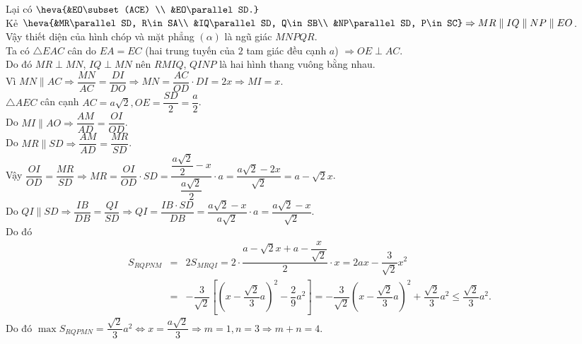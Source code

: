 \begin{ex}
{\begin{enumerate}
Lại có $\heva{&EO\subset(ACE) \\
&EO\parallel SD.}$\\
Kẻ $\heva{&MR\parallel SD, R\in SA\\
&IQ\parallel SD, Q\in SB\\
&NP\parallel SD, P\in SC} \Rightarrow MR\parallel IQ\parallel NP\parallel EO$.\\
Vậy thiết diện của hình chóp và mặt phẳng $(\alpha)$ là ngũ giác $MNPQR$.\\
Ta có $\triangle EAC$ cân do $EA=EC$ (hai trung tuyến của $2$ tam giác đều cạnh $a$) $\Rightarrow OE\perp AC$.\\
Do đó $MR\perp MN$, $IQ\perp MN$ nên $RMIQ$, $QINP$ là hai hình thang vuông bằng nhau.\\
Vì $MN\parallel AC\Rightarrow \dfrac{MN}{AC}=\dfrac{DI}{DO} \Rightarrow MN=\dfrac{AC}{OD} \cdot DI=2x \Rightarrow MI=x$.\\
$\triangle AEC$ cân cạnh $AC=a \sqrt{2}, OE=\dfrac{SD}{2}=\dfrac{a}{2}$.\\
Do $MI\parallel AO\Rightarrow \dfrac{AM}{AD}=\dfrac{OI}{OD}$.\\
Do $MR\parallel SD\Rightarrow \dfrac{AM}{AD}=\dfrac{MR}{SD}$.\\
Vậy $\dfrac{OI}{OD}=\dfrac{MR}{SD} \Rightarrow MR=\dfrac{OI}{OD} \cdot SD=\dfrac{\dfrac{a \sqrt{2}}{2}-x}{\dfrac{a \sqrt{2}}{2}} \cdot a=\dfrac{a \sqrt{2}-2x}{\sqrt{2}}=a-\sqrt{2} x$.\\
Do $QI\parallel SD\Rightarrow \dfrac{IB}{DB}=\dfrac{QI}{SD} \Rightarrow QI=\dfrac{IB\cdot SD}{DB}=\dfrac{a \sqrt{2}-x}{a \sqrt{2}} \cdot a=\dfrac{a \sqrt{2}-x}{\sqrt{2}}$.\\
Do đó
\begin{eqnarray*}
S_{RQPNM}&=&2S_{MRQI}=2\cdot \dfrac{a-\sqrt{2} x+a-\dfrac{x}{\sqrt{2}}}{2} \cdot x=2a x-\dfrac{3}{\sqrt{2}} x^2\\
&= &-\dfrac{3}{\sqrt{2}}\left[\left(x-\dfrac{\sqrt{2}}{3} a\right)^2-\dfrac{2}{9} a^2\right]=-\dfrac{3}{\sqrt{2}}\left(x-\dfrac{\sqrt{2}}{3} a\right)^2+\dfrac{\sqrt{2}}{3} a^2\leq \dfrac{\sqrt{2}}{3} a^2.
\end{eqnarray*}
Do đó $\max S_{RQPMN}=\dfrac{\sqrt{2}}{3} a^2\Leftrightarrow x=\dfrac{a \sqrt{2}}{3} \Rightarrow m=1, n=3\Rightarrow m+n=4$.
\end{enumerate}
}\end{ex}

